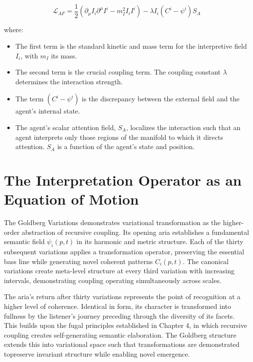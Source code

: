 \begin{equation}
\mathcal{L}_{AF} = \frac{1}{2} \left( \partial_\mu I_i \partial^\mu I^i - m_I^2 I_i I^i \right) - \lambda I_i (C^i - \psi^i) S_A
\end{equation}

where:
\begin{itemize}
    \item The first term is the standard kinetic and mass term for the interpretive field \(I_i\), with \(m_I\) its mass.
    \item The second term is the crucial coupling term. The coupling constant \(\lambda\) determines the interaction strength.
    \item The term \((C^i - \psi^i)\) is the discrepancy between the external field and the agent's internal state.
    \item The agent's scalar attention field, \(S_A\), localizes the interaction such that an agent interprets only those regions of the manifold to which it directs attention. \(S_A\) is a function of the agent's state and position.
\end{itemize}

\section{The Interpretation Operator as an Equation of Motion}

The Goldberg Variations \autocite{Bach1741} demonstrates variational transformation as the higher-order abstraction of recursive coupling. Its opening aria establishes a fundamental semantic field \(\psi_i(p,t)\) in its harmonic and metric structure. Each of the thirty subsequent variations applies a transformation operator, preserving the essential bass line while generating novel coherent patterns \(C_i(p,t)\). The canonical variations create meta-level structure at every third variation with increasing intervals, demonstrating coupling operating simultaneously across scales.

The aria's return after thirty variations represents the point of recognition at a higher level of coherence. Identical in form, its character is transformed into fullness by the listener's journey preceding through the diversity of its facets. This builds upon the fugal principles established in Chapter 4, in which recursive coupling creates self-generating semantic elaboration. The Goldberg structure extends this into variational space such that transformations are demonstrated topreserve invariant structure while enabling novel emergence.

